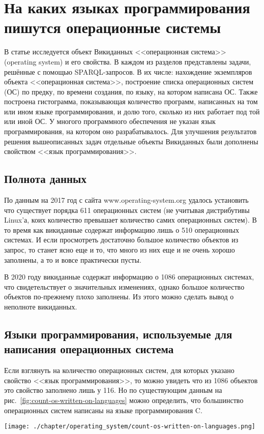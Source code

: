 \chapter{На каких языках программирования пишутся операционные системы}
\label{ch:operating-sysmets}

В статье исследуется объект Викиданных <<операционная система>> (operating system) и его свойства. В каждом из разделов представлены задачи, решённые с помощью SPARQL-запросов. В их числе: нахождение экземпляров объекта <<операционная система>>, построение списка операционных систем (ОС) по предку, по времени создания, по языку, на котором написана ОС. Также построена гистограмма, показывающая количество программ, написанных на том или ином языке программирования, и долю того, сколько из них работает под той или иной ОС. У многого программного обеспечения не указан язык программирования, на котором оно разрабатывалось. Для улучшения результатов решения вышеописанных задач отдельные объекты Викиданных были дополнены свойством <<язык программирования>>.

\section{Полнота данных}
По данным на 2017 год с сайта www.operating-system.org удалось установить что существует порядка 611 операционных систем (не учитывая дистрибутивы Linux'а, коих количество превышает количество самих операционных систем). В то время как викиданные содержат информацию лишь о 510 операционных системах. И если просмотреть достаточно большое количество объектов из запрос, то станет ясно еще и то, что много из них еще и не очень хорошо заполнены, а то и вовсе практически пусты.

В 2020 году викиданные содержат информацию о 1086 операционных системах, что свидетельствует о значительных изменениях, однако большое количество объектов по-прежнему плохо заполнены. Из этого можно сделать вывод о неполноте викиданных.

\section{Языки программирования, используемые для написания операционных система}
Если взглянуть на количество операционных систем, для которых указано свойство <<язык программирования>>, то можно увидеть что из 1086 объектов это свойство заполнено лишь у 116. Но по существующим данным на рис.~\ref{fig:count-os-written-on-languages} можно определить, что большинство операционных систем написаны на языке программирования C. 
\begin{figure*}[h!]
	\texttt{[image: ./chapter/operating\_system/count-os-written-on-languages.png]}
	\caption{Количество операционных систем, написанных на языках программирования (данные на 2020 год.)}
	\label{fig:count-os-written-on-languages}
\end{figure*}


